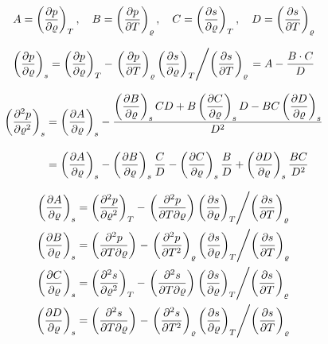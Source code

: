 \documentclass{article}
\begin{document}
\begin{equation}
A = \der{p}{\varrho}{T} ,\quad  
B  = \der{p}{T}{\varrho} ,\quad 
C  = \der{s}{\varrho}{T} ,\quad 
D  = \der{s}{T}{\varrho}
\end{equation}

\begin{equation}
\der{p}{\varrho}{s} = \der{p}{\varrho}{T}- \left. \der{p}{T}{\varrho}\der{s}{\varrho}{T} \middle/ \der{s}{T}{\varrho} \right. = A - \frac{B\cdot C}{D}
\end{equation}

\begin{align}
\der{^2p}{\varrho^2}{s} &= \der{A}{\varrho}{s} -\frac{\der{B}{\varrho}{s} C D + B \der{C}{\varrho}{s} D - B C \der{D}{\varrho}{s} }{D^2} 
\\[10pt] &= \der{A}{\varrho}{s} - \der{B}{\varrho}{s}\frac{C}{D} - \der{C}{\varrho}{s}\frac{B}{D} + \der{D}{\varrho}{s}\frac{BC}{D^2}
\end{align}

\begin{align}
\der{A}{\varrho}{s} &= \der{^2p}{\varrho^2}{T} - \left. \der{^2p}{T\partial\varrho}{} \der{s}{\varrho}{T} \middle/ \der{s}{T}{\varrho} \right. \\
\der{B}{\varrho}{s} &= \der{^2p}{T\partial\varrho}{} - \left. \der{^2p}{T^2}{\varrho} \der{s}{\varrho}{T} \middle/ \der{s}{T}{\varrho} \right. \\
\der{C}{\varrho}{s} &= \der{^2s}{\varrho^2}{T} - \left. \der{^2s}{T\partial\varrho}{} \der{s}{\varrho}{T} \middle/ \der{s}{T}{\varrho} \right. \\
\der{D}{\varrho}{s} &= \der{^2s}{T\partial\varrho}{} - \left. \der{^2s}{T^2}{\varrho} \der{s}{\varrho}{T} \middle/ \der{s}{T}{\varrho} \right. 
\end{align}
\end{document}
